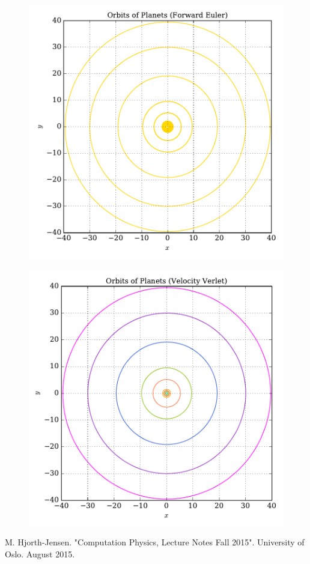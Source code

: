 \documentclass[prb,aps,twocolumn,showpacs,10pt]{revtex4-1}
\begin{document}
\begin{center}
\begin{figure}
\includegraphics[scale=0.7]{solar_system_euler_orbit.pdf}
\end{figure}
\end{center}
\begin{center}
\begin{figure}
\includegraphics[scale=0.7]{solar_system_vv_orbit.pdf}
\end{figure}
\end{center}


\newpage 
\begin{references}
 M. Hjorth-Jensen. "Computation Physics, Lecture Notes Fall 2015". University of Oslo. August 2015.
\end{references}
\end{document}
